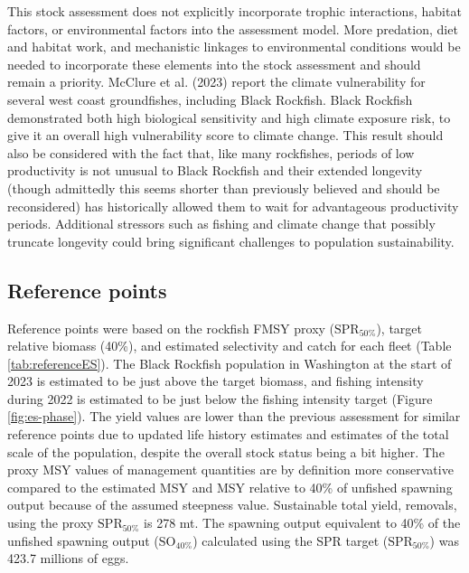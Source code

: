 \documentclass[11pt,
  english,
  letterpaper,
]{article}
\begin{document}
This stock assessment does not explicitly incorporate trophic interactions, habitat factors, or environmental factors into the assessment model. More predation, diet and habitat work, and mechanistic linkages to environmental conditions would be needed to incorporate these elements into the stock assessment and should remain a priority. McClure et al. (2023) report the climate vulnerability for several west coast groundfishes, including Black Rockfish. Black Rockfish demonstrated both high biological sensitivity and high climate exposure risk, to give it an overall high vulnerability score to climate change. This result should also be considered with the fact that, like many rockfishes, periods of low productivity is not unusual to Black Rockfish and their extended longevity (though admittedly this seems shorter than previously believed and should be reconsidered) has historically allowed them to wait for advantageous productivity periods. Additional stressors such as fishing and climate change that possibly truncate longevity could bring significant challenges to population sustainability.

\hypertarget{reference-points}{%
\subsection*{Reference points}\label{reference-points}}

Reference points were based on the rockfish FMSY proxy (\(\text{SPR}_{50\%}\)), target relative biomass (40\%), and estimated selectivity and catch for each fleet (Table \ref{tab:referenceES}). The Black Rockfish population in Washington at the start of 2023 is estimated to be just above the target biomass, and fishing intensity during 2022 is estimated to be just below the fishing intensity target (Figure \ref{fig:es-phase}). The yield values are lower than the previous assessment for similar reference points due to updated life history estimates and estimates of the total scale of the population, despite the overall stock status being a bit higher. The proxy MSY values of management quantities are by definition more conservative compared to the estimated MSY and MSY relative to 40\% of unfished spawning output because of the assumed steepness value. Sustainable total yield, removals, using the proxy \(\text{SPR}_{50\%}\) is 278 mt. The spawning output equivalent to 40\% of the unfished spawning output (\(\text{SO}_{40\%}\)) calculated using the SPR target (\(\text{SPR}_{50\%}\)) was 423.7 millions of eggs.
\end{document}
